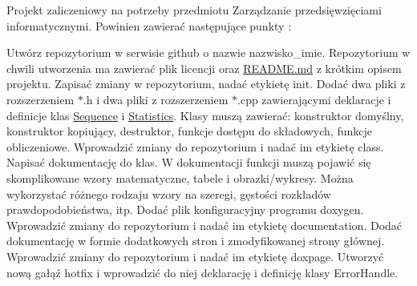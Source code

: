 Projekt zaliczeniowy na potrzeby przedmiotu Zarządzanie przedsięwzięciami informatycznymi. Powinien zawierać następujące punkty \+: ~\newline
 
\begin{DoxyItemize}
\end{DoxyItemize}Utwórz repozytorium w serwisie github o nazwie \textquotesingle{}nazwisko\+\_\+imie\textquotesingle{}.  Repozytorium w chwili utworzenia ma zawierać plik licencji oraz \mbox{\hyperlink{_r_e_a_d_m_e_8md}{README.\+md}} z krótkim opisem projektu.  Zapisać zmiany w repozytorium, nadać etykietę \textquotesingle{}init\textquotesingle{}.  Dodać dwa pliki z rozszerzeniem $\ast$.h i dwa pliki z rozszerzeniem $\ast$.cpp zawierającymi deklaracje i definicje klas \textquotesingle{}\mbox{\hyperlink{class_sequence}{Sequence}}\textquotesingle{} i \textquotesingle{}\mbox{\hyperlink{class_statistics}{Statistics}}\textquotesingle{}. Klasy muszą zawierać\+: konstruktor domyślny, konstruktor kopiujący, destruktor, funkcje dostępu do składowych, funkcje obliczeniowe. Wprowadzić zmiany do repozytorium i nadać im etykietę \textquotesingle{}class\textquotesingle{}.  Napisać dokumentację do klas. W dokumentacji funkcji muszą pojawić się skomplikowane wzory matematyczne, tabele i obrazki/wykresy. Można wykorzystać różnego rodzaju wzory na szeregi, gęstości rozkładów prawdopodobieństwa, itp. Dodać plik konfiguracyjny programu doxygen. Wprowadzić zmiany do repozytorium i nadać im etykietę \textquotesingle{}documentation\textquotesingle{}.  Dodać dokumentację w formie dodatkowych stron i zmodyfikowanej strony głównej. Wprowadzić zmiany do repozytorium i nadać im etykietę \textquotesingle{}doxpage\textquotesingle{}.  Utworzyć nową gałąź \textquotesingle{}hotfix\textquotesingle{} i wprowadzić do niej deklarację i definicję klasy \textquotesingle{}Error\+Handle\textquotesingle{}. 